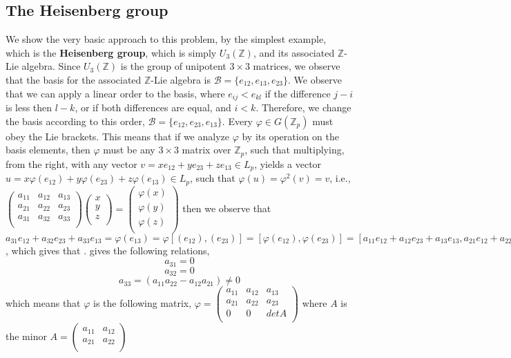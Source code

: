 \documentclass[12pt]{article}
\begin{document}
\subsection{The Heisenberg group}
We show the very basic approach to this problem, by the simplest example, which is the \textbf{Heisenberg group}, which is simply $U_3(\mathbb{Z})$, and its associated $\mathbb{Z}$-Lie algebra.
Since $U_3(\mathbb{Z})$ is the group of unipotent $3\times 3$ matrices, we observe that the basis for the associated $\mathbb{Z}$-Lie algebra is $\mathcal{B}=\{e_{12},e_{13},e_{23}\}$. We observe that we can apply a linear order to the basis, where $e_{ij}<e_{kl}$ if the difference $j-i$ is less then $l-k$, or if both differences are equal, and $i<k$. Therefore, we change the basis according to this order, $\mathcal{B}=\{e_{12},e_{23},e_{13}\}$.
Every $\varphi\in G(\mathbb{Z}_p)$ must obey the Lie brackets. This means that if we analyze $\varphi$ by its operation on the basis elements, then $\varphi$ must be any $3\times 3$ matrix over $\mathbb{Z}_p$, such that multiplying, from the right, with any vector $v=xe_{12}+ye_{23}+ze_{13}\in L_p$, yields a vector $u=x\varphi(e_{12})+y\varphi(e_{23})+z\varphi(e_{13})\in L_p$, such that $\varphi(u)=\varphi^2(v)=v$, i.e., $\begin{pmatrix}
a_{11} & a_{12} & a_{13}\\
a_{21} & a_{22} & a_{23}\\
a_{31} & a_{32} & a_{33}\\
\end{pmatrix}\begin{pmatrix}
x \\ y \\ z\\
\end{pmatrix}=\begin{pmatrix}
\varphi(x) \\ \varphi(y) \\ \varphi(z)\\
\end{pmatrix}$
then we observe that $a_{31}e_{12}+a_{32}e_{23}+a_{33}e_{13}=\varphi(e_{13})=\varphi[(e_{12}),(e_{23})]=[\varphi(e_{12}),\varphi(e_{23})]=[a_{11}e_{12}+a_{12}e_{23}+a_{13}e_{13},a_{21}e_{12}+a_{22}e_{23}+a_{23}e_{13}]$, which gives that .
gives the following relations, $$
a_{31}=0$$
$$a_{32}=0$$
$$a_{33}=(a_{11}a_{22}-a_{12}a_{21})\neq 0
$$
which means that $\varphi$ is the following matrix, $\varphi=\begin{pmatrix}
a_{11} & a_{12} & a_{13}\\
a_{21} & a_{22} & a_{23}\\
0 & 0 & detA\\
\end{pmatrix}
$
where $A$ is the minor $
A=\begin{pmatrix}
a_{11} & a_{12}\\
a_{21} & a_{22}\\
\end{pmatrix}
$
\end{document}
